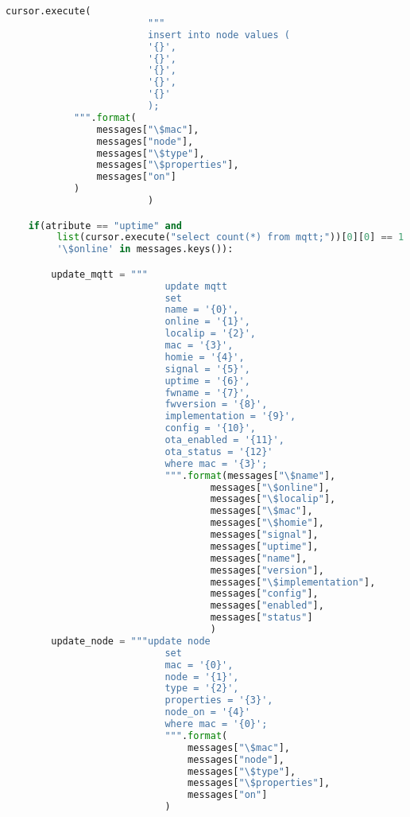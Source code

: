\documentclass[times, utf8, zavrsni]{fer}
\begin{document}
{\begin{lstlisting}[language=Python, caption=Parsiranje poruka i spremanje u bazu podataka]
        cursor.execute(
                         """
                         insert into node values (
                         '{}',
                         '{}',
                         '{}',
                         '{}',
                         '{}'
                         );
            """.format(
                messages["\$mac"],
                messages["node"],
                messages["\$type"],
                messages["\$properties"],
                messages["on"]
            )
                         )

    if(atribute == "uptime" and
         list(cursor.execute("select count(*) from mqtt;"))[0][0] == 1 and
         '\$online' in messages.keys()):

        update_mqtt = """
                            update mqtt
                            set
                            name = '{0}',
                            online = '{1}',
                            localip = '{2}',
                            mac = '{3}',
                            homie = '{4}',
                            signal = '{5}',
                            uptime = '{6}',
                            fwname = '{7}',
                            fwversion = '{8}',
                            implementation = '{9}',
                            config = '{10}',
                            ota_enabled = '{11}',
                            ota_status = '{12}'
                            where mac = '{3}';
                            """.format(messages["\$name"],
                                    messages["\$online"],
                                    messages["\$localip"],
                                    messages["\$mac"],
                                    messages["\$homie"],
                                    messages["signal"],
                                    messages["uptime"],
                                    messages["name"],
                                    messages["version"],
                                    messages["\$implementation"],
                                    messages["config"],
                                    messages["enabled"],
                                    messages["status"]
                                    )
        update_node = """update node
                            set
                            mac = '{0}',
                            node = '{1}',
                            type = '{2}',
                            properties = '{3}',
                            node_on = '{4}'
                            where mac = '{0}';
                            """.format(
                                messages["\$mac"],
                                messages["node"],
                                messages["\$type"],
                                messages["\$properties"],
                                messages["on"]
                            )


\end{lstlisting}}
\end{document}
